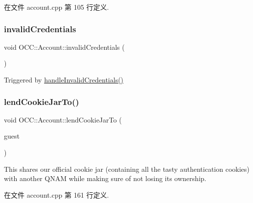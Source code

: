 在文件 account.\+cpp 第 105 行定义.

\mbox{\label{class_o_c_c_1_1_account_aeb4f6dd55bbe3c921f80bbc34bd82c0c}} 
\subsubsection{\texorpdfstring{invalid\+Credentials}{invalidCredentials}}
{\footnotesize\ttfamily void O\+C\+C\+::\+Account\+::invalid\+Credentials (\begin{DoxyParamCaption}{ }\end{DoxyParamCaption})\hspace{0.3cm}{\ttfamily [signal]}}



Triggered by \hyperlink{class_o_c_c_1_1_account_a3df5d30b88c86ec96f066a5a01373156}{handle\+Invalid\+Credentials()} 

\mbox{\label{class_o_c_c_1_1_account_ab51f897fa5e5ecc46a8d87098736f161}} 
\subsubsection{\texorpdfstring{lend\+Cookie\+Jar\+To()}{lendCookieJarTo()}}
{\footnotesize\ttfamily void O\+C\+C\+::\+Account\+::lend\+Cookie\+Jar\+To (\begin{DoxyParamCaption}\item[{Q\+Network\+Access\+Manager $\ast$}]{guest }\end{DoxyParamCaption})}

This shares our official cookie jar (containing all the tasty authentication cookies) with another Q\+N\+AM while making sure of not losing its ownership. 

在文件 account.\+cpp 第 161 行定义.

\mbox{\label{class_o_c_c_1_1_account_a1b9b895345cb7854c5048261de7cec06}} 
